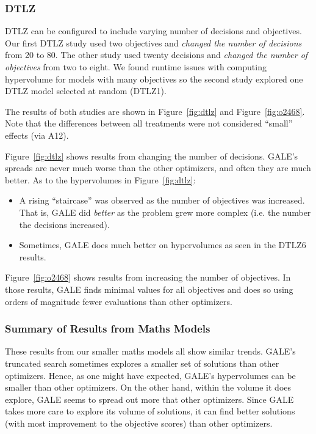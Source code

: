 \documentclass[10pt,journal,compsoc]{IEEEtran}
\newcommand{\bi}{\begin{itemize}}
\newcommand{\ei}{\end{itemize}}
\newcommand{\fig}[1]{Figure~\ref{fig:#1}}
\newenvironment{changed}{\par}{\par}
\newcommand{\addit}[1]{\begin{changed}\end{changed}}
\begin{document}
\begin{changed}
\subsubsection{DTLZ}

 DTLZ  can be configured to include varying number of decisions
and objectives.  
Our first DTLZ study used two objectives and  {\em changed the number of decisions} from 20 to 80. The other study used twenty decisions and  {\em changed
the number of objectives} from two to eight. We found
 runtime issues with  computing hypervolume for models with many objectives
 so  the  second study  explored one DTLZ model selected at random (DTLZ1).

The results of both studies are shown in \fig{dtlz}
and \fig{o2468}. Note that the differences
between all treatments were not considered ``small'' effects (via A12).

\fig{dtlz} shows results from changing the number of decisions.
GALE's spreads are never much worse than the other
optimizers, and often they are much
better. 
As to the hypervolumes in  \fig{dtlz}:
\bi
\item
A rising ``staircase'' was observed as the number of
objectives was increased. That is,  GALE did {\em better}
as the problem grew more complex (i.e. the number the decisions increased).
\item
Sometimes, GALE does much better on hypervolumes as
seen in the DTLZ6 results.
\ei
\fig{o2468} shows results from increasing the
number of objectives. 
In those results,   GALE 
finds minimal values for all objectives and does
so using  orders of magnitude fewer evaluations than
 other optimizers.
 \addit{xomoresults}




\subsubsection{Summary of Results from Maths Models}

These results from our smaller maths models all show similar trends.
GALE's truncated search sometimes explores a
smaller set of solutions than other
optimizers.  Hence, as one might have expected, GALE's hypervolumes can be smaller than other optimizers. On the other hand,
within the volume it does explore, GALE seems to spread
out more that other optimizers.
Since GALE takes more care to explore its volume of solutions,
it can find better solutions (with most improvement to the objective scores)
than other optimizers.
\end{changed}
\end{document}
